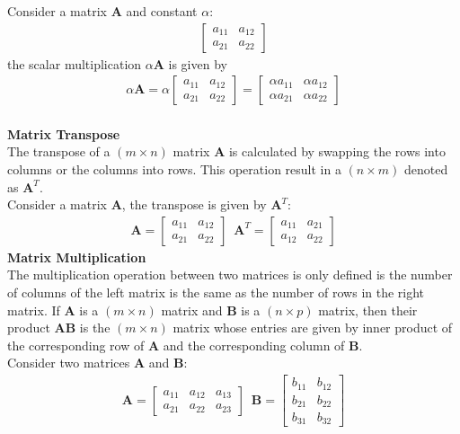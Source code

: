 Consider  a matrix \textbf{A} and constant $\alpha$:
\begin{align}
  \begin{bmatrix}
    a_{11} & a_{12} \\
    a_{21} & a_{22}
  \end{bmatrix}
\end{align}
the scalar multiplication $\alpha \textbf{A}$ is given by
\begin{align}
  \alpha \textbf{A} = 
  \alpha \begin{bmatrix}
    a_{11} & a_{12} \\
    a_{21} & a_{22}
  \end{bmatrix}
  = \begin{bmatrix}
    \alpha a_{11} & \alpha a_{12} \\
    \alpha a_{21} & \alpha a_{22}
  \end{bmatrix}
\end{align} \\
\noindent \textbf{Matrix Transpose} \\
\noindent The transpose of a $(m \times n)$ matrix $\textbf{A}$ is calculated by swapping the rows into columns or the columns into rows. This operation result in a $(n \times m)$ denoted as $\textbf{A}^T$. \\
Consider  a matrix \textbf{A}, the transpose is given by $\textbf{A}^T$:
\begin{align}
  \textbf{A} = \begin{bmatrix}
    a_{11} & a_{12} \\
    a_{21} & a_{22}
  \end{bmatrix} \, \, \, 
  \textbf{A}^T = \begin{bmatrix}
    a_{11} & a_{21} \\
    a_{12} & a_{22}
  \end{bmatrix}
\end{align}
\noindent \textbf{Matrix Multiplication} \\
The multiplication operation between two matrices is only defined is the number of columns of the left matrix is the same as the number of rows in the right matrix. If \textbf{A} is a $(m \times n)$ matrix and \textbf{B} is a $(n \times p)$ matrix, then their product \textbf{AB} is the $(m \times n)$ matrix whose entries are given by inner product of the corresponding row of \textbf{A} and the corresponding column of \textbf{B}.\\
Consider two matrices \textbf{A} and \textbf{B}:
\begin{align}
  \textbf{A} =
  \begin{bmatrix}
    a_{11} & a_{12} & a_{13} \\
    a_{21} & a_{22} & a_{23}
  \end{bmatrix} \, \, \, 
  \textbf{B} =
  \begin{bmatrix}
    b_{11} & b_{12} \\
    b_{21} & b_{22} \\
    b_{31} & b_{32}
  \end{bmatrix}
\end{align}

